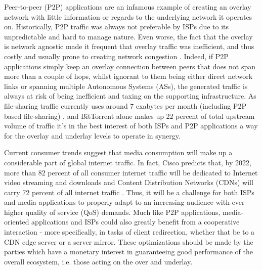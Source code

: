 \documentclass[
  oneside,
  11pt, a4paper,
  footinclude=true,
  headinclude=true,
  cleardoublepage=empty
]{scrbook}
\begin{document}
    Peer-to-peer (P2P) applications are an infamous example of creating an overlay network with little information or regards to the underlying network it operates on. Historically, P2P traffic was always not preferable by ISPs due to its unpredictable and hard to manage nature. Even worse, the fact that the overlay is network agnostic made it frequent that overlay traffic was inefficient, and thus costly and usually prone to creating network congestion \cite{dan-Commag10}. Indeed, if P2P applications simply keep an overlay connection between peers that does not span more than a couple of hops, whilst ignorant to them being either direct network links or spanning multiple Autonomous Systems (ASs), the generated traffic is always at risk of being inefficient and taxing on the supporting infrastructure. As file-sharing traffic currently uses around 7 exabytes per month (including P2P based file-sharing) \cite{cisco}, and BitTorrent alone makes up 22 percent of total upstream volume of traffic \cite{sandvine} it's in the best interest of both ISPs and P2P applications a way for the overlay and underlay levels to operate in synergy.
    
    Current consumer trends suggest that media consumption will make up a considerable part of global internet traffic. In fact, Cisco predicts that, by 2022, more than 82 percent of all consumer internet traffic will be dedicated to Internet video streaming and downloads and Content Distribution Networks (CDNs) will carry 72 percent of all internet traffic \cite{cisco} . Thus, it will be a challenge for both ISPs and media applications to properly adapt to an increasing audience with ever higher quality of service (QoS) demands. Much like P2P applications, media-oriented applications and ISPs could also greatly benefit from a cooperative interaction - more specifically, in tasks of client redirection, whether that be to a CDN edge server or a server mirror. These optimizations should be made by the parties which have a monetary interest in guaranteeing good performance of the overall ecosystem, i.e. those acting on the over and underlay. 
    
\end{document}
